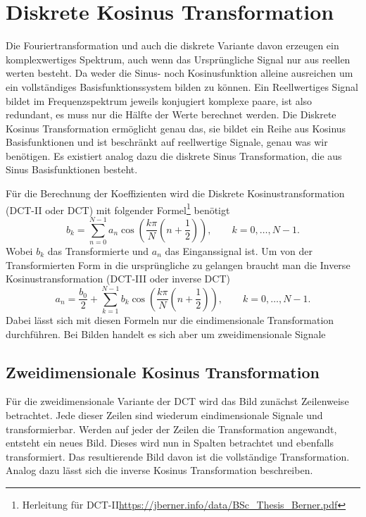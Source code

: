 %
%
%
%
\section{Diskrete Kosinus Transformation
\label{jpeg:section:dct}}
Die Fouriertransformation und auch die diskrete Variante davon erzeugen ein komplexwertiges Spektrum, auch wenn das Ursprüngliche Signal nur aus reellen werten besteht.
Da weder die Sinus- noch Kosinusfunktion alleine ausreichen um ein vollständiges Basisfunktionssystem bilden zu können.
Ein Reellwertiges Signal bildet im Frequenzspektrum jeweils konjugiert komplexe paare, ist also redundant, es muss nur die Hälfte der Werte berechnet werden.
Die Diskrete Kosinus Transformation ermöglicht genau das, sie bildet ein Reihe aus Kosinus Basisfunktionen und ist beschränkt auf reellwertige Signale, genau was wir benötigen.
Es existiert analog dazu die diskrete Sinus Transformation, die aus Sinus Basisfunktionen besteht.

Für die Berechnung der Koeffizienten wird die Diskrete Kosinustransformation (DCT-II oder DCT) mit folgender Formel\footnote{Herleitung für DCT-II\url{https://jberner.info/data/BSc_Thesis_Berner.pdf}} benötigt 
\begin{equation}
    b_k
    =
    \sum \limits_{n=0}^{N-1} a_n 
    \cos\left(
        \frac{k\pi}{N}\left(n + \frac{1}{2} \right) 
    \right),
    \qquad k = 0,\dots,N-1.
\label{jpeg:equationdct2}
\end{equation}
Wobei \(b_k\) das Transformierte und \(a_n\) das Einganssignal ist.
Um von der Transformierten Form in die ursprüngliche zu gelangen braucht man die Inverse Kosinustransformation (DCT-III oder inverse DCT)
\begin{equation}
    a_n
    =
    \frac{b_0}{2} +
    \sum \limits_{k=1}^{N-1} b_k 
    \cos\left(
    \frac{k\pi}{N}\left(n + \frac{1}{2} \right) 
    \right),
    \qquad k = 0,\dots,N-1.
    \label{jpeg:equationdct3}
\end{equation}
Dabei lässt sich mit diesen Formeln nur die eindimensionale Transformation durchführen.
Bei Bilden handelt es sich aber um zweidimensionale Signale

\subsection{Zweidimensionale Kosinus Transformation
\label{jpeg:subsection:dct2dim}}
Für die zweidimensionale Variante der DCT wird das Bild zunächst Zeilenweise betrachtet. Jede dieser Zeilen sind wiederum eindimensionale Signale und transformierbar.
Werden auf jeder der Zeilen die Transformation angewandt, entsteht ein neues Bild.
Dieses wird nun in Spalten betrachtet und ebenfalls transformiert.
Das resultierende Bild davon ist die vollständige Transformation.
Analog dazu lässt sich die inverse Kosinus Transformation beschreiben.

